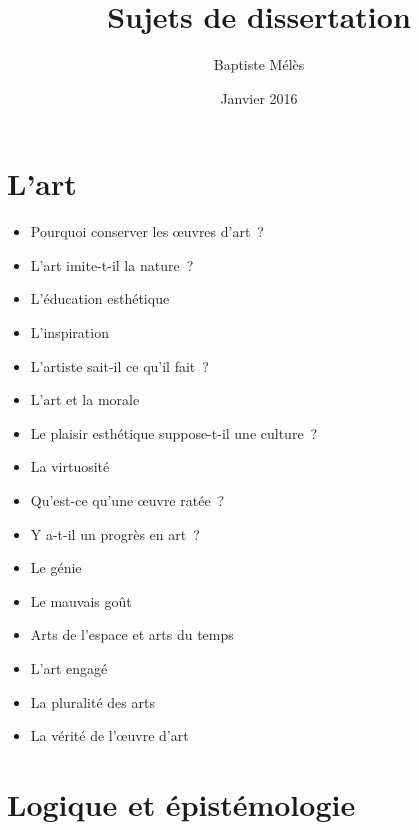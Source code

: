 \documentclass[a4paper,11pt]{article}
\author{Baptiste Mélès}
\title{Sujets de dissertation}
\date{Janvier 2016}
\newenvironment{liste}{\begin{itemize}}{\end{itemize}}
\begin{document}
\maketitle

\section{L'art}

\begin{liste}
  \item Pourquoi conserver les œuvres d'art~?
  \item L'art imite-t-il la nature~?
  \item L'éducation esthétique
  \item L'inspiration
  \item L'artiste sait-il ce qu'il fait~?
  \item L'art et la morale
  \item Le plaisir esthétique suppose-t-il une culture~?
  \item La virtuosité
  \item Qu'est-ce qu'une œuvre ratée~?
  \item Y a-t-il un progrès en art~?
  \item Le génie
  \item Le mauvais goût
  \item Arts de l'espace et arts du temps
  \item L'art engagé
  \item La pluralité des arts
  \item La vérité de l'œuvre d'art
\end{liste}

\section{Logique et épistémologie}
\end{document}
